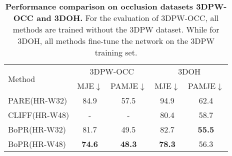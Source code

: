 \documentclass[10pt,twocolumn,letterpaper]{article}
\begin{document}
\begin{table}
\centering
{}
\caption{\textbf{Axis-wise performance comparison on the 3DPW-Test.} All methods have been trained on dataset with 3DPW.}
\label{tab:occ}
\end{table}


\begin{table}
\centering
\begin{tabular}{lcccc}
\toprule[1.5pt]
\multirow{2}{*}{Method} & \multicolumn{2}{c}{3DPW-OCC} & \multicolumn{2}{c}{3DOH} \\ 
 & MJE$\downarrow$ & PAMJE$\downarrow$ & MJE$\downarrow$ & PAMJE$\downarrow$ \\ \hline
PARE(HR-W32) &84.9 &57.5 &94.9 &62.4  \\ 
CLIFF(HR-W48) &- &- &80.4 &58.7 \\\hline
BoPR(HR-W32) &81.7 &49.5 &82.7 &\textbf{55.5} \\
BoPR(HR-W48) &\textbf{74.6} &\textbf{48.3} &\textbf{78.3} &56.3 \\\bottomrule[1.5pt]
\end{tabular}

\caption{\textbf{Performance comparison on occlusion datasets 3DPW-OCC and 3DOH.} For the evaluation of 3DPW-OCC, all methods are trained without the 3DPW dataset. While for 3DOH, all methods fine-tune the network on the 3DPW training set.}
\label{table1}
\end{table}
\end{document}
